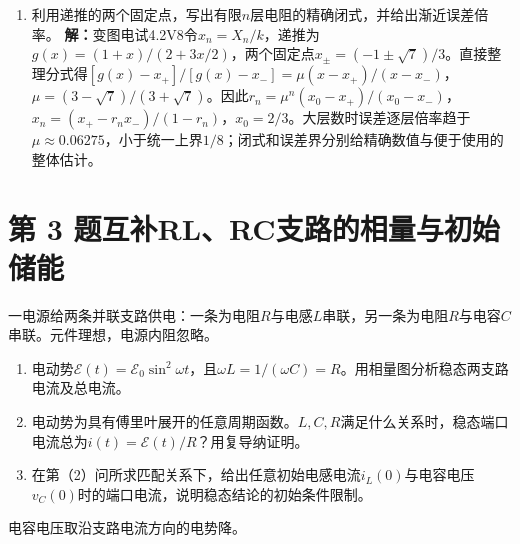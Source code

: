 \documentclass[UTF8,fontset=fandol,a4paper,11pt]{ctexart}
\newcommand{\figcaption}[1]{\par\vspace{2pt}{\small\color{muted}#1}\par}
\begin{document}
\begin{enumerate}
\item 利用递推的两个固定点，写出有限$n$层电阻的精确闭式，并给出渐近误差倍率。
\textbf{解：}变图电试4.2V8令$x_n=X_n/k$，递推为$g(x)=(1+x)/(2+3x/2)$，两个固定点$x_\pm=(-1\pm\sqrt7)/3$。直接整理分式得$[g(x)-x_+]/[g(x)-x_-]=\mu(x-x_+)/(x-x_-)$，$\mu=(3-\sqrt7)/(3+\sqrt7)$。因此$r_n=\mu^n(x_0-x_+)/(x_0-x_-)$，$x_n=(x_+-r_nx_-)/(1-r_n)$，$x_0=2/3$。大层数时误差逐层倍率趋于$\mu\approx0.06275$，小于统一上界$1/8$；闭式和误差界分别给精确数值与便于使用的整体估计。
\begin{center}\begin{minipage}{.98\linewidth}\centering
{}
\figcaption{变图电试4.2V8\quad 精确分式迭代的正误差迅速减小}
\end{minipage}\end{center}
\end{enumerate}



\section*{第 3 题\quad 互补RL、RC支路的相量与初始储能}\label{q:3}


一电源给两条并联支路供电：一条为电阻$R$与电感$L$串联，另一条为电阻$R$与电容$C$串联。元件理想，电源内阻忽略。
\begin{enumerate}
\item 电动势$\mathcal E(t)=\mathcal E_0\sin^2\omega t$，且$\omega L=1/(\omega C)=R$。用相量图分析稳态两支路电流及总电流。
\item 电动势为具有傅里叶展开的任意周期函数。$L,C,R$满足什么关系时，稳态端口电流总为$i(t)=\mathcal E(t)/R$？用复导纳证明。
\item 在第（2）问所求匹配关系下，给出任意初始电感电流$i_L(0)$与电容电压$v_C(0)$时的端口电流，说明稳态结论的初始条件限制。
\end{enumerate}
电容电压取沿支路电流方向的电势降。
\end{document}
